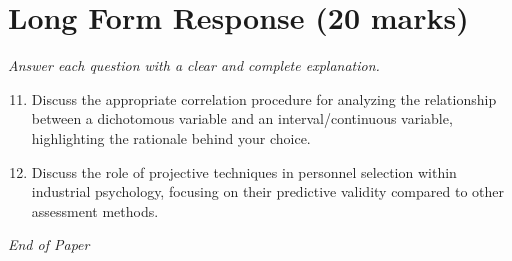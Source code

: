 \documentclass[12pt]{article}
\begin{document}
\section*{Long Form Response (20 marks)}
\textit{Answer each question with a clear and complete explanation.}
\begin{enumerate}[label=\arabic*.]
\setcounter{enumi}{10}
\item Discuss the appropriate correlation procedure for analyzing the relationship between a
dichotomous variable and an interval/continuous variable, highlighting the rationale
behind your choice.
\item Discuss the role of projective techniques in personnel selection within industrial
psychology, focusing on their predictive validity compared to other assessment methods.
\end{enumerate}

\vfill
\noindent\textit{End of Paper}
\end{document}
